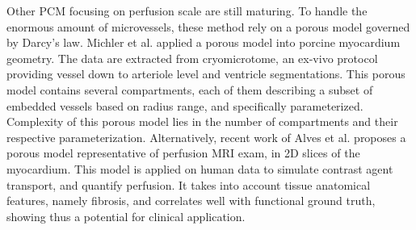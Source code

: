 \documentclass[journal]{IEEEtran}
\begin{document}
 
Other PCM focusing on perfusion scale are still maturing. To handle the enormous amount of microvessels, these method rely on a porous model governed by Darcy's law. %
Michler et al. \cite{michler2013computationally} applied a porous model into porcine myocardium geometry. The data are extracted from cryomicrotome, an ex-vivo protocol providing vessel down to arteriole level and ventricle
segmentations. This porous model contains several compartments, each of them describing a subset of embedded vessels based on radius range, and specifically parameterized. %
Complexity of this porous model lies in the number of compartments and their respective parameterization. %
Alternatively, recent work of Alves et al. \cite{alves2019simulation} proposes a porous model representative of perfusion MRI exam, in 2D slices of the myocardium. This model is applied on human data to simulate contrast agent transport, and quantify perfusion. It takes into account tissue anatomical features, namely fibrosis, and correlates well with functional ground truth, showing thus a potential for clinical application. %
\end{document}
